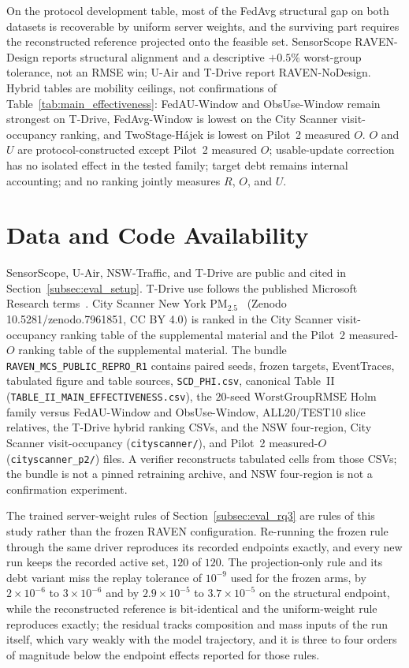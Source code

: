\documentclass[letterpaper,journal]{IEEEtran}
\begin{document}
On the protocol development table, most of the FedAvg structural gap on both
datasets is recoverable by uniform server weights, and the surviving part
requires the reconstructed reference projected onto the feasible set.
SensorScope RAVEN-Design reports structural alignment and a descriptive $+0.5\%$
worst-group tolerance, not an RMSE win; U-Air and T-Drive report RAVEN-NoDesign.
Hybrid tables are mobility ceilings, not confirmations of
Table~\ref{tab:main_effectiveness}: FedAU-Window and ObsUse-Window remain
strongest on T-Drive, FedAvg-Window is lowest on the City Scanner visit-occupancy
ranking, and TwoStage-H\'ajek is lowest on Pilot~2 measured $O$.  $O$ and $U$ are
protocol-constructed except Pilot~2 measured $O$; usable-update correction has no
isolated effect in the tested family; target debt remains internal accounting; and
no ranking jointly measures $R$, $O$, and $U$.

\section*{Data and Code Availability}
SensorScope, U-Air, NSW-Traffic, and T-Drive are public and cited in
Section~\ref{subsec:eval_setup}.  T-Drive use follows the published
Microsoft Research terms~\cite{yuan2010tdrive}.
City Scanner New York {PM}$_{2.5}$~\cite{wang2023cityscanner}
(Zenodo 10.5281/zenodo.7961851, CC BY 4.0) is ranked in
the City Scanner visit-occupancy ranking table of the supplemental material and
the Pilot~2 measured-$O$ ranking table of the supplemental material.
The bundle \texttt{RAVEN\_MCS\_PUBLIC\_REPRO\_R1} contains paired seeds,
frozen targets, EventTraces, tabulated figure and table sources,
\texttt{SCD\_PHI.csv}, canonical Table~II
(\texttt{TABLE\_II\_MAIN\_EFFECTIVENESS.csv}),
the $20$-seed $\mathrm{WorstGroupRMSE}$ Holm family versus FedAU-Window and
ObsUse-Window, ALL20/TEST10 slice relatives, the T-Drive hybrid ranking CSVs,
and the NSW four-region, City Scanner visit-occupancy
(\texttt{cityscanner/}), and Pilot~2 measured-$O$ (\texttt{cityscanner\_p2/})
files.  A verifier reconstructs tabulated cells from those CSVs; the bundle is
not a pinned retraining archive, and NSW four-region is not a confirmation
experiment.

The trained server-weight rules of Section~\ref{subsec:eval_rq3} are rules of
this study rather than the frozen RAVEN configuration.  Re-running the frozen
rule through the same driver reproduces its recorded endpoints exactly, and every
new run keeps the recorded active set, $120$ of $120$.  The projection-only rule
and its debt variant miss the replay tolerance of $10^{-9}$ used for the frozen
arms, by $2\times10^{-6}$ to $3\times10^{-6}$ and by $2.9\times10^{-5}$ to
$3.7\times10^{-5}$ on the structural endpoint, while the reconstructed reference
is bit-identical and the uniform-weight rule reproduces exactly; the residual
tracks composition and mass inputs of the run itself, which vary weakly with the
model trajectory, and it is three to four orders of magnitude below the endpoint
effects reported for those rules.



\end{document}
